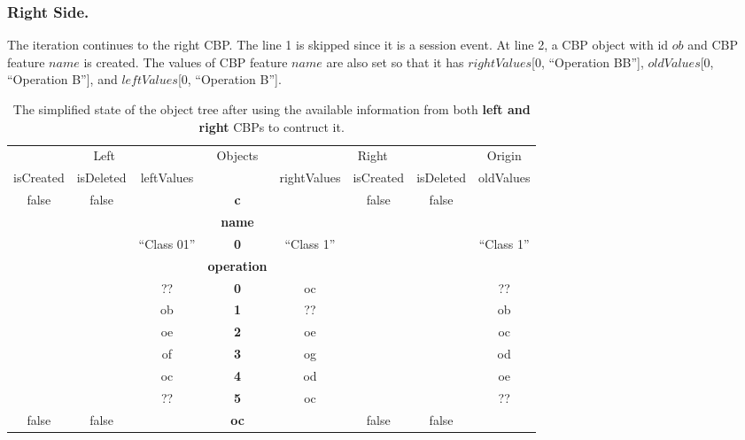 \documentclass{llncs}
\begin{document}
\subsubsection{Right Side.} \label{sec:right_side} The iteration continues to the right CBP. The line 1 is skipped since it is a session event.  At line 2, a CBP object with id $ob$ and CBP feature $name$ is created. The values of CBP feature $name$ are also set so that it has $rightValues$[0, ``Operation BB''], $oldValues$[0, ``Operation B''], and $leftValues$[0, ``Operation B'']. 

\begin{table}
    \centering
    \begin{footnotesize}
        \caption{The simplified state of the object tree after using the available information from both \textbf{left and right} CBPs to contruct it.}
        \label{table:right_object_tree}
        \begin{tabular}{  c  c  c  c  c  c  c  c  }
            \hline
            \multicolumn{3}{c}{Left} & \multirow{2}{*}{Objects} & \multicolumn{3}{c}{Right} & Origin\\
            \hhline{---~----}
            isCreated & isDeleted & leftValues & & rightValues & isCreated & isDeleted & oldValues\\
            \hline
            \rowcolor{gray1}
            false & false & & \textbf{\textsf{c}} & & false & false & \\
            \rowcolor{gray2}
            & & & \textbf{\textsf{name}} & & & & \\
            & & ``Class 01'' & \textbf{0} & ``Class 1'' & & & ``Class 1'' \\
            \rowcolor{gray2}
            & & & \textbf{\textsf{operation}} & & & & \\
            & & ?? & \textbf{\small{0}} & oc & & & ?? \\
            & & ob & \textbf{\small{1}} & ?? & & & ob \\
            & & oe & \textbf{\small{2}} & oe & & & oc \\
            & & of & \textbf{\small{3}} & og & & & od \\
            & & oc & \textbf{\small{4}} & od & & & oe \\
            & & ?? & \textbf{\small{5}} & oc & & & ?? \\
            \hline
            \rowcolor{gray1}
            false & false & & \textbf{\textsf{oc}} & & false & false & \\

\end{tabular}
\end{footnotesize}
\end{table}
\end{document}
